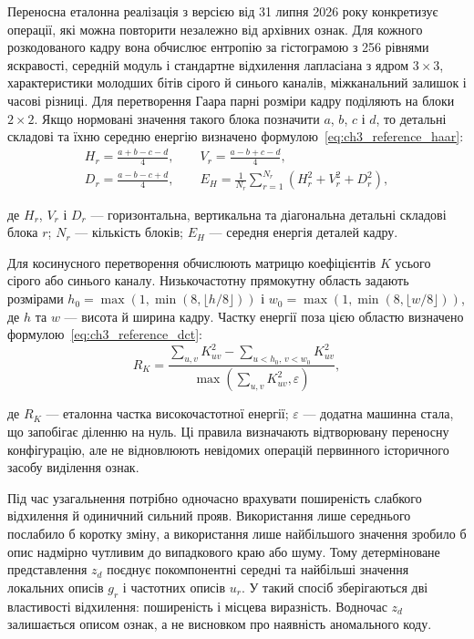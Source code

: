 Переносна еталонна реалізація з версією від 31 липня 2026 року конкретизує операції, які можна повторити незалежно від архівних ознак. Для кожного розкодованого кадру вона обчислює ентропію за гістограмою з 256 рівнями яскравості, середній модуль і стандартне відхилення лапласіана з ядром $3\times3$, характеристики молодших бітів сірого й синього каналів, міжканальний залишок і часові різниці. Для перетворення Гаара парні розміри кадру поділяють на блоки $2\times2$. Якщо нормовані значення такого блока позначити $a$, $b$, $c$ і $d$, то детальні складові та їхню середню енергію визначено формулою~\eqref{eq:ch3_reference_haar}:
\begin{equation}
\begin{gathered}
H_r=\frac{a+b-c-d}{4},\qquad V_r=\frac{a-b+c-d}{4},\\
D_r=\frac{a-b-c+d}{4},\qquad E_H=\frac{1}{N_r}\sum_{r=1}^{N_r}\left(H_r^2+V_r^2+D_r^2\right),
\end{gathered}
\label{eq:ch3_reference_haar}
\end{equation}

де $H_r$, $V_r$ і $D_r$ --- горизонтальна, вертикальна та діагональна детальні складові блока $r$; $N_r$ --- кількість блоків; $E_H$ --- середня енергія деталей кадру.

Для косинусного перетворення обчислюють матрицю коефіцієнтів $K$ усього сірого або синього каналу. Низькочастотну прямокутну область задають розмірами $h_0=\max(1,\min(8,\lfloor h/8\rfloor))$ і $w_0=\max(1,\min(8,\lfloor w/8\rfloor))$, де $h$ та $w$ --- висота й ширина кадру. Частку енергії поза цією областю визначено формулою~\eqref{eq:ch3_reference_dct}:
\begin{equation}
R_K=\frac{\sum_{u,v}K_{uv}^2-\sum_{u<h_0,\,v<w_0}K_{uv}^2}{\max\!\left(\sum_{u,v}K_{uv}^2,\varepsilon\right)},
\label{eq:ch3_reference_dct}
\end{equation}

де $R_K$ --- еталонна частка високочастотної енергії; $\varepsilon$ --- додатна машинна стала, що запобігає діленню на нуль. Ці правила визначають відтворювану переносну конфігурацію, але не відновлюють невідомих операцій первинного історичного засобу виділення ознак.

Під час узагальнення потрібно одночасно врахувати поширеність слабкого відхилення й одиничний сильний прояв. Використання лише середнього послабило б коротку зміну, а використання лише найбільшого значення зробило б опис надмірно чутливим до випадкового краю або шуму. Тому детерміноване представлення $z_d$ поєднує покомпонентні середні та найбільші значення локальних описів $g_r$ і частотних описів $u_r$. У такий спосіб зберігаються дві властивості відхилення: поширеність і місцева виразність. Водночас $z_d$ залишається описом ознак, а не висновком про наявність аномального коду.

